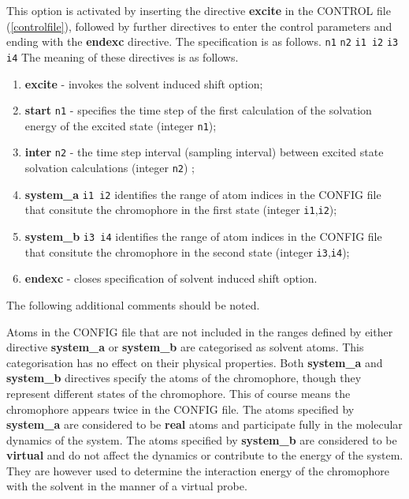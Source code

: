 This option is activated by inserting the directive {\bf excite}
in the CONTROL file (\ref{controlfile}), followed by further directives to
enter the control parameters and ending with the {\bf endexc} directive. The
specification is as follows.\newline \newline
{} \newline
{} {\tt n1} \newline
{} {\tt n2} \newline
{} {\tt i1 i2} \newline
{} {\tt i3 i4} \newline
{}\newline       
\newline
The meaning of these directives is as follows.
\begin{enumerate}
\item {\bf excite} - invokes the solvent induced shift option;
\item {\bf start} {\tt n1} - specifies the time step of the first calculation
  of the solvation energy of the excited state (integer {\tt n1});
\item {\bf inter} {\tt n2} - the time step interval (sampling interval)
  between excited state solvation calculations (integer {\tt n2}) ;
\item {\bf system\_a} {\tt i1 i2} identifies the range of atom indices in 
the CONFIG file that consitute the chromophore in the first state (integer 
{\tt i1},{\tt i2});
\item {\bf system\_b} {\tt i3 i4} identifies the range of atom indices in 
the CONFIG file that consitute the chromophore in the second state (integer 
{\tt i3},{\tt i4});
\item {\bf endexc} - closes specification of solvent induced shift option.
\end{enumerate}
The following additional comments should be noted. 

Atoms in the CONFIG file that are not included in the ranges defined by either
directive {\bf system\_a} or {\bf system\_b} are categorised as solvent
atoms. This categorisation has no effect on their physical properties.
Both {\bf system\_a} and {\bf system\_b} directives specify the atoms of the
chromophore, though they represent different states of the chromophore. This
of course means the chromophore appears twice in the CONFIG file. The
atoms specified by {\bf system\_a} are considered to be {\bf real} atoms and
participate fully in the molecular dynamics of the system. The atoms specified
by {\bf system\_b} are considered to be {\bf virtual} and do not affect the
dynamics or contribute to the energy of the system. They are however used to
determine the interaction energy of the chromophore with the solvent in the
manner of a virtual probe. 

